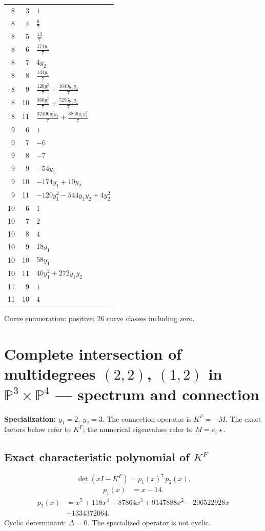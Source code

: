 \documentclass[10pt,a4paper]{article}
\begin{document}
{\begin{longtable}{rrp{125mm}}
8 & 3 & $1$\\
8 & 4 & $\frac{6}{7}$\\
8 & 5 & $\frac{13}{7}$\\
8 & 6 & $\frac{174 y_{1}}{7}$\\
8 & 7 & $4 y_{2}$\\
8 & 8 & $\frac{144 y_{1}}{7}$\\
8 & 9 & $\frac{120 y_{1}^{2}}{7} + \frac{1640 y_{1} y_{2}}{7}$\\
8 & 10 & $\frac{360 y_{1}^{2}}{7} + \frac{7256 y_{1} y_{2}}{7}$\\
8 & 11 & $\frac{32400 y_{1}^{2} y_{2}}{7} + \frac{8856 y_{1} y_{2}^{2}}{7}$\\
9 & 6 & $1$\\
9 & 7 & $-6$\\
9 & 8 & $-7$\\
9 & 9 & $- 54 y_{1}$\\
9 & 10 & $- 174 y_{1} + 10 y_{2}$\\
9 & 11 & $- 120 y_{1}^{2} - 544 y_{1} y_{2} + 4 y_{2}^{2}$\\
10 & 6 & $1$\\
10 & 7 & $2$\\
10 & 8 & $4$\\
10 & 9 & $18 y_{1}$\\
10 & 10 & $58 y_{1}$\\
10 & 11 & $40 y_{1}^{2} + 272 y_{1} y_{2}$\\
11 & 9 & $1$\\
11 & 10 & $4$\\
\end{longtable}}
Curve enumeration: positive; 26 curve classes including zero.
\clearpage\section*{Complete intersection of multidegrees $(2,2)$, $(1,2)$ in $\mathbb P^{3}\times \mathbb P^{4}$ --- spectrum and connection}
\textbf{Specialization:} $y_1=2,\ y_2=3$. The connection operator is $K^F=-M$. The exact factors below refer to $K^F$; the numerical eigenvalues refer to $M=c_1\star$.
\subsection*{Exact characteristic polynomial of $K^F$}
\[\det(xI-K^F)=p_{1}(x)^{7}\,p_{2}(x).\]
\[\begin{aligned}p_{1}(x)&=x - 14.\end{aligned}\]
\[\begin{aligned}p_{2}(x)&=x^{5} + 118 x^{4} - 87864 x^{3} + 9147888 x^{2} - 206522928 x\\&+1334372064.\end{aligned}\]
Cyclic determinant: $\Delta=0$. The specialized operator is not cyclic.
\end{document}
